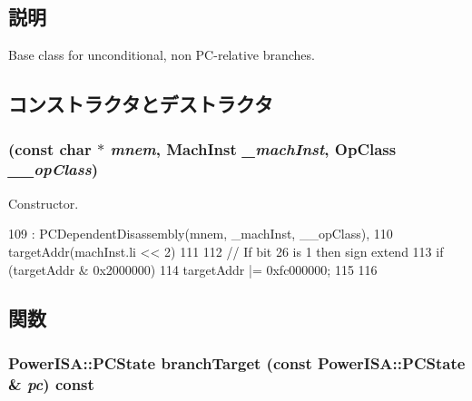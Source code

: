 \subsection{説明}
Base class for unconditional, non PC-\/relative branches. 

\subsection{コンストラクタとデストラクタ}
\hypertarget{classPowerISA_1_1BranchNonPCRel_a1117eecee7455c92a3da453b412e574d}{
\subsubsection[{BranchNonPCRel}]{ (const char $\ast$ {\em mnem}, \/  {\bf MachInst} {\em \_\-machInst}, \/  OpClass {\em \_\-\_\-opClass})}}
\label{classPowerISA_1_1BranchNonPCRel_a1117eecee7455c92a3da453b412e574d}


Constructor. 


\begin{DoxyCode}
109         : PCDependentDisassembly(mnem, _machInst, __opClass),
110           targetAddr(machInst.li << 2)
111     {
112         // If bit 26 is 1 then sign extend
113         if (targetAddr & 0x2000000) {
114             targetAddr |= 0xfc000000;
115         }
116     }
\end{DoxyCode}


\subsection{関数}
\hypertarget{classPowerISA_1_1BranchNonPCRel_a860401b0a6432ac5dbe246c64448d56d}{
\subsubsection[{branchTarget}]{\setlength{\rightskip}{0pt plus 5cm}PowerISA::PCState branchTarget (const PowerISA::PCState \& {\em pc}) const}}
\label{classPowerISA_1_1BranchNonPCRel_a860401b0a6432ac5dbe246c64448d56d}



